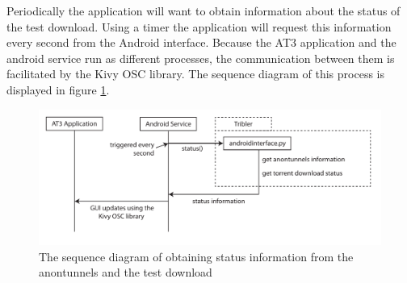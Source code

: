 Periodically the application will want to obtain information about the status of the test download. Using a timer the application will request this information every second from the Android interface. Because the AT3 application and the android service run as different processes, the communication between them is facilitated by the Kivy OSC library. The sequence diagram of this process is displayed in figure \ref{fig:sequenceinfo}.

\begin{figure}[t!]
	\centering
	\includegraphics[width=\textwidth]{graphics/sequence-info.pdf}
	\caption{The sequence diagram of obtaining status information from the anontunnels and the test download}
	\label{fig:sequenceinfo}
\end{figure}



